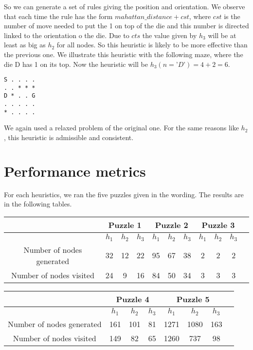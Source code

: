 \documentclass[]{article}
\begin{document}
So we can generate a set of rules giving the position and orientation.
We observe that each time the rule has the form  $mahattan\_distance + cst$, where $cst$ is the number of move needed to put the 1 on top of the die and this number is directed linked to the orientation o the die.
Due to $cts$ the value given by $h_3$ will be at least as big as $h_2$ for all nodes.
So this heuristic is likely to be more effective than the previous one.
We illustrate this heuristic with the following maze, where the die D has 1 on its top.
Now the heuristic will be $h_3(n=’D’) = 4 + 2 = 6$.

\begin{lstlisting}
S . . . .
. . * * *
D * . . G
. . . . .
* . . . .
\end{lstlisting}

We again used a relaxed problem of the original one.
For the same reasons like $h_2$, this heuristic is admissible and consistent.

\section{Performance metrics}

For each heuristics, we ran the five puzzles given in the wording.
The results are in the following tables.

\begin{center}
    \begin{tabular}{| c | c | c | c | c | c | c | c | c | c | c |}
      \cline{2-10} & \multicolumn{3}{|c|}{Puzzle 1} & \multicolumn{3}{|c|}{Puzzle 2} & \multicolumn{3}{|c|}{Puzzle 3} \\
      \hline
    & $h_1$ & $h_2$ & $h_3$ & $h_1$ & $h_2$& $h_3$ & $h_1$ &  $h_2$ & $h_3$ \\ \hline
    Number of nodes generated & 32 & 12 & 22 & 95 & 67 & 38 & 2 & 2 & 2 \\ \hline
    Number of nodes visited   & 24 & 9  & 16 & 84 & 50 & 34 & 3 & 3 & 3 \\ \hline
    \end{tabular}
\end{center}

\begin{center}
    \begin{tabular}{| c | c | c | c | c | c | c | c |}
      \cline{2-7} & \multicolumn{3}{|c|}{Puzzle 4} & \multicolumn{3}{|c|}{Puzzle 5} \\
      \hline
    & $h_1$ & $h_2$ & $h_3$ & $h_1$ & $h_2$& $h_3$ \\ \hline
    Number of nodes generated & 161 & 101 & 81 & 1271 & 1080 & 163  \\ \hline
    Number of nodes visited   & 149 & 82  & 65 & 1260 &  737 &  98 \\ \hline
    \end{tabular}
\end{center}
\end{document}
